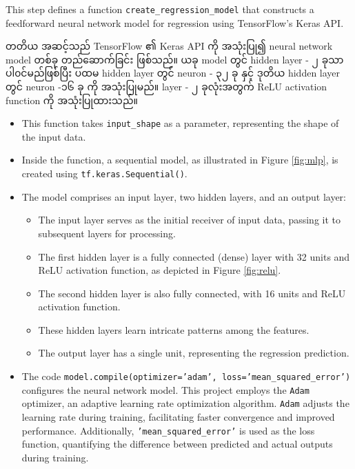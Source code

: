 \begin{step}
This step defines a function \texttt{create\_regression\_model} that constructs a feedforward neural network model for regression using TensorFlow's Keras API. 

တတိယ အဆင့်သည် TensorFlow ၏ Keras API ကို အသုံးပြု၍ neural network model တစ်ခု တည်ဆောက်ခြင်း ဖြစ်သည်။ ယခု model တွင် hidden layer - ၂ ခုသာ ပါ၀င်မည်ဖြစ်ပြီး ပထမ hidden layer တွင် neuron - ၃၂ ခု နှင့် ဒုတိယ hidden layer တွင် neuron -၁၆ ခု ကို အသုံးပြုမည်။ layer - ၂ ခုလုံးအတွက် ReLU activation function ကို အသုံးပြုထားသည်။ 

\begin{itemize}
    \item This function takes \texttt{input\_shape} as a parameter, representing the shape of the input data.
    \item Inside the function, a sequential model, as illustrated in Figure \ref{fig:mlp}, is created using \texttt{tf.keras.Sequential()}. 
    \item The model comprises an input layer, two hidden layers, and an output layer:
    \begin{itemize}
       \item The input layer serves as the initial receiver of input data, passing it to subsequent layers for processing.
       \item The first hidden layer is a fully connected (dense) layer with 32 units and ReLU activation function, as depicted in Figure \ref{fig:relu}.
       \item The second hidden layer is also fully connected, with 16 units and ReLU activation function.
       \item These hidden layers learn intricate patterns among the features.
       \item The output layer has a single unit, representing the regression prediction.
    \end{itemize}
    
    \item The code \texttt{model.compile(optimizer='adam', loss='mean\_squared\_error')} configures the neural network model. This project employs the \texttt{Adam} optimizer, an adaptive learning rate optimization algorithm. \texttt{Adam} adjusts the learning rate during training, facilitating faster convergence and improved performance. Additionally, \texttt{'mean\_squared\_error'} is used as the loss function, quantifying the difference between predicted and actual outputs during training.
\end{itemize}
\end{step}
